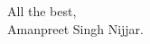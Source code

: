 \documentclass[10pt,a4paper,ragged2e,withhyper]{altacv}
\begin{document}







All the best, \linebreak \linebreak \\

Amanpreet Singh Nijjar.
\end{document}
